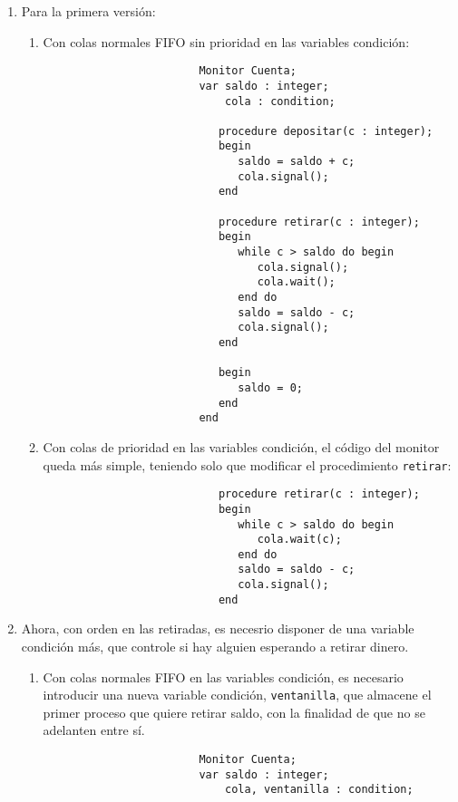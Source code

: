 \begin{ejercicio}
    \begin{enumerate}
        \item Para la primera versión:
            \begin{enumerate}[label=\alph*)]
                \item Con colas normales FIFO sin prioridad en las variables condición:
                    \begin{verbatim}
                        Monitor Cuenta;
                        var saldo : integer;
                            cola : condition;

                           procedure depositar(c : integer);
                           begin
                              saldo = saldo + c;
                              cola.signal();
                           end

                           procedure retirar(c : integer);
                           begin
                              while c > saldo do begin
                                 cola.signal();
                                 cola.wait();
                              end do
                              saldo = saldo - c;
                              cola.signal();
                           end

                           begin
                              saldo = 0;
                           end
                        end
                    \end{verbatim}
                \item Con colas de prioridad en las variables condición, el código del monitor queda más simple, teniendo solo que modificar el procedimiento \verb|retirar|:
                    \begin{verbatim}
                           procedure retirar(c : integer);
                           begin
                              while c > saldo do begin
                                 cola.wait(c);
                              end do
                              saldo = saldo - c;
                              cola.signal();
                           end
                    \end{verbatim}
            \end{enumerate}
        \item Ahora, con orden en las retiradas, es necesrio disponer de una variable condición más, que controle si hay alguien esperando a retirar dinero.
            \begin{enumerate}[label=\alph*)]
                \item Con colas normales FIFO en las variables condición, es necesario introducir una nueva variable condición, \verb|ventanilla|, que almacene el primer proceso que quiere retirar saldo, con la finalidad de que no se adelanten entre sí.
                    \begin{verbatim}
                        Monitor Cuenta;
                        var saldo : integer;
                            cola, ventanilla : condition;


\end{verbatim}
\end{enumerate}
\end{enumerate}
\end{ejercicio}
